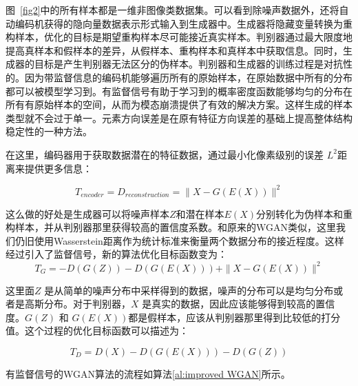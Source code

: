 图~\ref{fig2}中的所有样本都是一维非图像类数据集。可以看到除噪声数据外，还将自动编码机获得的隐向量数据表示形式输入到生成器中。生成器将隐藏变量转换为重构样本，优化的目标是期望重构样本尽可能接近真实样本。判别器通过最大限度地提高真样本和假样本的差异，从假样本、重构样本和真样本中获取信息。同时，生成器的目标是产生判别器无法区分的伪样本。判别器和生成器的训练过程是对抗性的。因为带监督信息的编码机能够遍历所有的原始样本，在原始数据中所有的分布都可以被模型学习到。有监督信号有助于学习到的概率密度函数能够均匀的分布在所有有原始样本的空间，从而为模态崩溃提供了有效的解决方案。这样生成的样本类型就不会过于单一。元素方向误差是在原有特征方向误差的基础上提高整体结构稳定性的一种方法。

在这里，编码器用于获取数据潜在的特征数据，通过最小化像素级别的误差 $ L ^ { 2 } $距离来提供更多信息：

\begin{equation}
\label{eq11}
T_{encoder} = D_{reconstruction}=\parallel X-G(E(X))\parallel^{2}
\end{equation}

这么做的好处是生成器可以将噪声样本$Z$和潜在样本$E(X)$分别转化为伪样本和重构样本，并从判别器那里获得较高的置信度系数。和原来的WGAN类似，这里我们仍旧使用Wasserstein距离作为统计标准来衡量两个数据分布的接近程度。这样经过引入了监督信号，新的算法优化目标函数变为：
\begin{equation}
\label{eq:12}
T_{G} = -D(G(Z))-D(G(E(X)))+\parallel X-G(E(X))\parallel^{2}
\end{equation}

这里面$Z$ 是从简单的噪声分布中采样得到的数据，噪声的分布可以是均匀分布或者是高斯分布。对于判别器，$X$ 是真实的数据，因此应该能够得到较高的置信度。$G(Z)$ 和 $G(E(X))$都是假样本，应该从判别器那里得到比较低的打分值。这个过程的优化目标函数可以描述为：

\begin{equation}
\label{eq12}
T_{D} = D(X)-D(G(E(X)))-D(G(Z))
\end{equation}

有监督信号的WGAN算法的流程如算法\ref{al:improved WGAN}所示。

